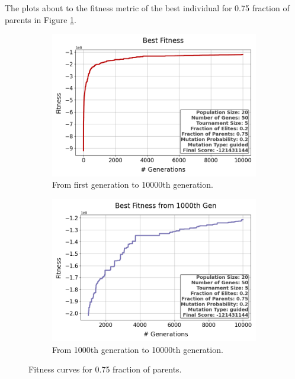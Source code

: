 \documentclass{assignment}
\begin{document}
The plots about to the fitness metric of the best individual for 0.75 fraction of parents in Figure \ref{fig:0.75parents}.
\begin{figure}[H]
    \begin{subfigure}{0.5\textwidth}
        \includegraphics[width=\textwidth]{figures/best_fitness_output_20_50_5_0.2_0.75_0.2_guided.png}
        \caption{From first generation to 10000th generation.}
    \end{subfigure}\hfill
    \begin{subfigure}{0.5\textwidth}
        \includegraphics[width=\textwidth]{figures/best_fitness_1000_output_20_50_5_0.2_0.75_0.2_guided.png}
        \caption{From 1000th generation to 10000th generation.}
    \end{subfigure}
    \caption{Fitness curves for 0.75 fraction of parents.}
\label{fig:0.75parents}
\end{figure}
\end{document}
